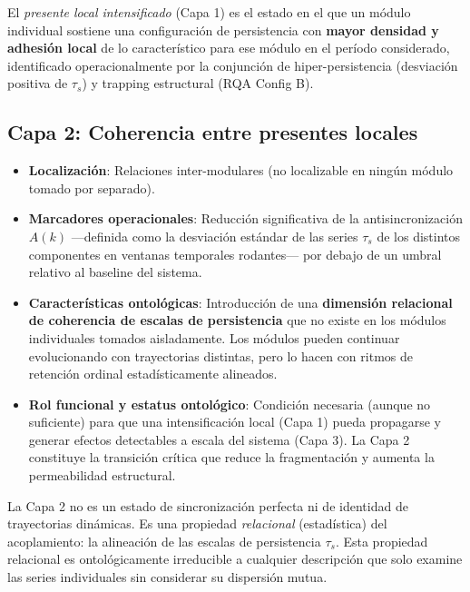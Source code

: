 \begin{conceptbox}[Definición]
El \textit{presente local intensificado} (Capa 1) es el estado en el que un módulo individual sostiene una configuración de persistencia con \textbf{mayor densidad y adhesión local} de lo característico para ese módulo en el período considerado, identificado operacionalmente por la conjunción de hiper-persistencia (desviación positiva de $\tau_s$) y trapping estructural (RQA Config B).
\end{conceptbox}

\subsection{Capa 2: Coherencia entre presentes locales}

\begin{itemize}
    \item \textbf{Localización}: Relaciones inter-modulares (no localizable en ningún módulo tomado por separado).
    \item \textbf{Marcadores operacionales}: Reducción significativa de la antisincronización $A(k)$ —definida como la desviación estándar de las series $\tau_s$ de los distintos componentes en ventanas temporales rodantes— por debajo de un umbral relativo al baseline del sistema.
    \item \textbf{Características ontológicas}: Introducción de una \textbf{dimensión relacional de coherencia de escalas de persistencia} que no existe en los módulos individuales tomados aisladamente. Los módulos pueden continuar evolucionando con trayectorias distintas, pero lo hacen con ritmos de retención ordinal estadísticamente alineados.
    \item \textbf{Rol funcional y estatus ontológico}: Condición necesaria (aunque no suficiente) para que una intensificación local (Capa 1) pueda propagarse y generar efectos detectables a escala del sistema (Capa 3). La Capa 2 constituye la transición crítica que reduce la fragmentación y aumenta la permeabilidad estructural.
\end{itemize}

La Capa 2 no es un estado de sincronización perfecta ni de identidad de trayectorias dinámicas. Es una propiedad \textit{relacional} (estadística) del acoplamiento: la alineación de las escalas de persistencia $\tau_s$. Esta propiedad relacional es ontológicamente irreducible a cualquier descripción que solo examine las series individuales sin considerar su dispersión mutua.


